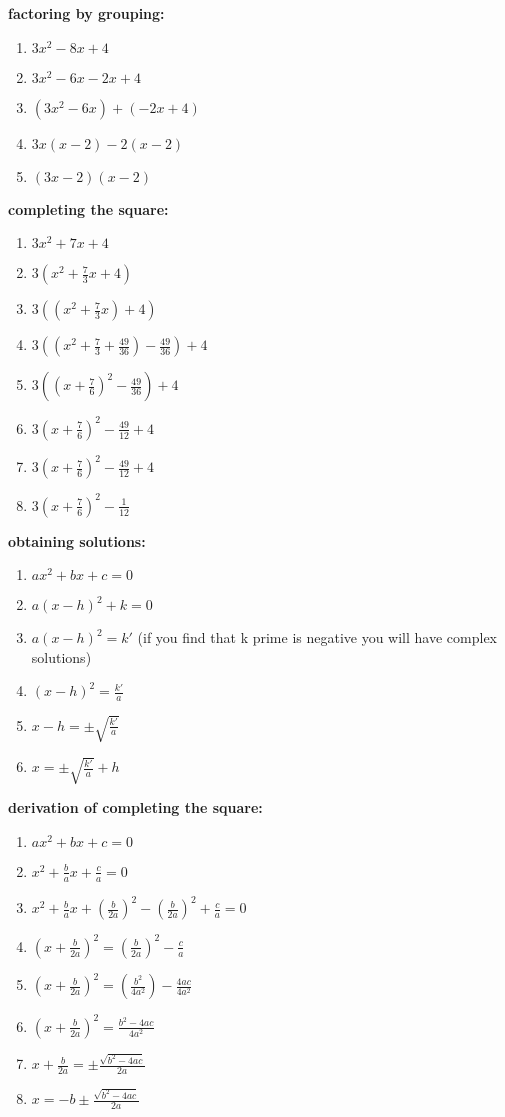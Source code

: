 \documentclass{article}
\begin{document}
\textbf{factoring by grouping:}
	\begin{enumerate}
		\item $3x^2 -8x + 4$
		\item $3x^2 - 6x -2x + 4$
		\item $(3x^2 - 6x) + (-2x + 4)$
		\item $3x(x - 2) - 2(x - 2)$
		\item $(3x - 2)(x-2)$
	\end{enumerate}

\textbf{completing the square:}
	\begin{enumerate}
		\item $3x^2 + 7x + 4$
		\item $3(x^2 + \frac{7}{3}x + 4)$
		\item $3((x^2 + \frac{7}{3}x) + 4)$
		\item $3((x^2 + \frac{7}{3} + \frac{49}{36}) - \frac{49}{36}) + 4$
		\item $3((x + \frac{7}{6})^2 - \frac{49}{36}) + 4$
		\item $3(x + \frac{7}{6})^2 - \frac{49}{12} + 4$
		\item $3(x + \frac{7}{6})^2 - \frac{49}{12} + 4$
		\item $3(x + \frac{7}{6})^2 - \frac{1}{12}$
	\end{enumerate}

\textbf{obtaining solutions:}
	\begin{enumerate}
		\item $ax^2 + bx + c = 0$
		\item $a(x - h)^2 + k = 0$
		\item $a(x - h)^2 = k'$ (if you find that k prime is negative you will have complex solutions) 
		\item $(x - h)^2 = \frac{k'}{a}$ 
		\item $x - h = \pm \sqrt{\frac{k'}{a}}$
		\item $x = \pm \sqrt{\frac{k'}{a}} + h$
	\end{enumerate}

\textbf{derivation of completing the square:}
	\begin{enumerate}
		\item $ax^2 + bx + c = 0$
		\item $x^2 + \frac{b}{a}x + \frac{c}{a} = 0$
		\item $x^2 + \frac{b}{a}x + (\frac{b}{2a})^2 - (\frac{b}{2a})^2 + \frac{c}{a} = 0$
		\item $(x + \frac{b}{2a})^2 = (\frac{b}{2a})^2 - \frac{c}{a}$
	
		\item $(x + \frac{b}{2a})^2 = (\frac{b^2}{4a^2}) - \frac{4ac}{4a^2}$
		\item $(x + \frac{b}{2a})^2 = \frac{b^2 - 4ac}{4a^2}$
		\item $x + \frac{b}{2a} = \pm \frac{\sqrt{b^2 - 4ac}}{2a}$
		\item $x = -b \pm \frac{\sqrt{b^2 - 4ac}}{2a}$
	\end{enumerate}
\end{document}
